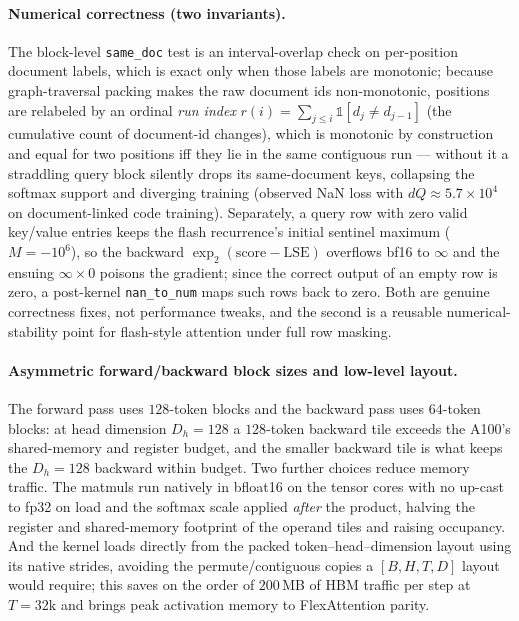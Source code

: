 \paragraph{Numerical correctness (two invariants).}
The block-level \texttt{same\_doc} test is an interval-overlap check on per-position
document labels, which is exact only when those labels are monotonic; because
graph-traversal packing makes the raw document ids non-monotonic, positions are
relabeled by an ordinal \emph{run index} $r(i)=\sum_{j\le i}\mathbb{1}[d_j\neq d_{j-1}]$
(the cumulative count of document-id changes), which is monotonic by construction and
equal for two positions iff they lie in the same contiguous run --- without it a
straddling query block silently drops its same-document keys, collapsing the softmax
support and diverging training (observed NaN loss with $dQ\approx 5.7\times 10^{4}$ on
document-linked code training). Separately, a query row with zero valid key/value
entries keeps the flash recurrence's initial sentinel maximum ($M=-10^{6}$), so the
backward $\exp_2(\text{score}-\text{LSE})$ overflows bf16 to $\infty$ and the ensuing
$\infty\times 0$ poisons the gradient; since the correct output of an empty row is
zero, a post-kernel \texttt{nan\_to\_num} maps such rows back to zero. Both are genuine
correctness fixes, not performance tweaks, and the second is a reusable
numerical-stability point for flash-style attention under full row masking.

\paragraph{Asymmetric forward/backward block sizes and low-level layout.}
The forward pass uses $128$-token blocks and the backward pass uses $64$-token blocks:
at head dimension $D_h=128$ a $128$-token backward tile exceeds the A100's
shared-memory and register budget, and the smaller backward tile is what keeps the
$D_h=128$ backward within budget. Two further choices reduce memory traffic. The
matmuls run natively in bfloat16 on the tensor cores with no up-cast to fp32 on load
and the softmax scale applied \emph{after} the product, halving the register and
shared-memory footprint of the operand tiles and raising occupancy. And the kernel
loads directly from the packed token--head--dimension layout using its native strides,
avoiding the permute/contiguous copies a $[B,H,T,D]$ layout would require; this saves
on the order of $200$\,MB of HBM traffic per step at $T=32\text{k}$ and brings peak
activation memory to FlexAttention parity.

